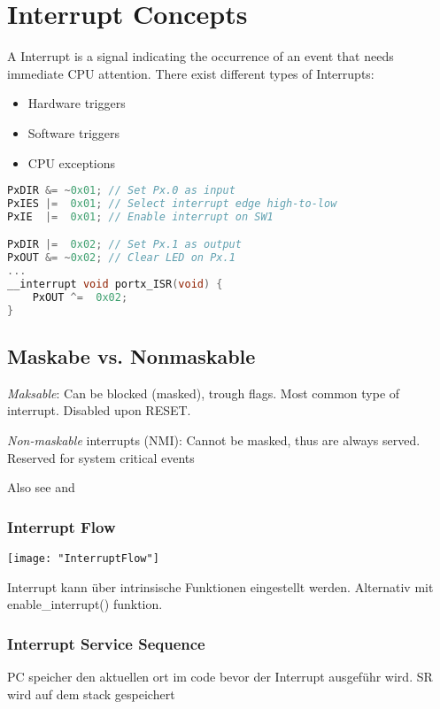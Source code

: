 \section{Interrupt Concepts }
A Interrupt is a signal indicating the occurrence of an event that needs immediate CPU attention.
There exist different types of Interrupts:
\begin{itemize}
	\itemsep-.5em 
	\item Hardware triggers
	\item Software triggers
	\item CPU exceptions
\end{itemize}

\begin{lstlisting}[language=c]
PxDIR &= ~0x01;	// Set Px.0 as input
PxIES |=  0x01; // Select interrupt edge high-to-low
PxIE  |=  0x01;	// Enable interrupt on SW1

PxDIR |=  0x02;	// Set Px.1 as output
PxOUT &= ~0x02;	// Clear LED on Px.1
...
__interrupt void portx_ISR(void) {
	PxOUT ^=  0x02;
}
\end{lstlisting}\vspace{-20px}

\subsection{Maskabe vs. Nonmaskable }
\textit{Maksable}: Can be blocked (masked), trough flags. Most common type of interrupt. Disabled upon RESET.

\textit{Non-maskable} interrupts (NMI): Cannot be masked, thus are always served. Reserved for system critical events

Also see  and 


\subsubsection{Interrupt Flow}
\texttt{[image: "InterruptFlow"]}

Interrupt kann über intrinsische Funktionen eingestellt werden.
Alternativ mit enable\_interrupt() funktion.


\subsubsection{Interrupt Service Sequence }
PC speicher den aktuellen ort im code bevor der Interrupt ausgeführ wird.
SR wird auf dem stack gespeichert

